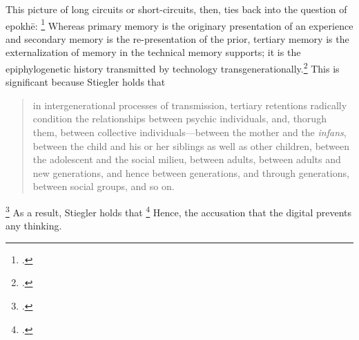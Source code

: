 \documentclass[letterpaper,notitlepage,12pt]{article}
\begin{document}
This picture of long circuits or short-circuits, then, ties back into the
question of epokh\={e}: \footcite[ch. 2.8]{stiegler_age_2019}
Whereas primary memory is the originary presentation of an experience and
secondary memory is the re-presentation of the prior, tertiary memory is the
externalization of memory in the technical memory supports; it is the
epiphylogenetic history transmitted by technology
transgenerationally.\footcite[p. 248]{stiegler_technics_1998}
This is significant because Stiegler holds that \blockquote{in intergenerational
  processes of transmission, tertiary retentions radically condition the
  relationships between psychic individuals, and, thorugh them, between
  collective individuals---between the mother and the \textit{infans}, between
  the child and his or her siblings as well as other children, between the
  adolescent and the social milieu, between adults, between adults and new
  generations, and hence between generations, and through generations, between
social groups, and so on.}\footcite[ch. 2.8]{stiegler_age_2019}
As a result, Stiegler holds that \footcite[ch. 2.9]{stiegler_age_2019}
Hence, the accusation that the digital prevents any thinking.
\end{document}
